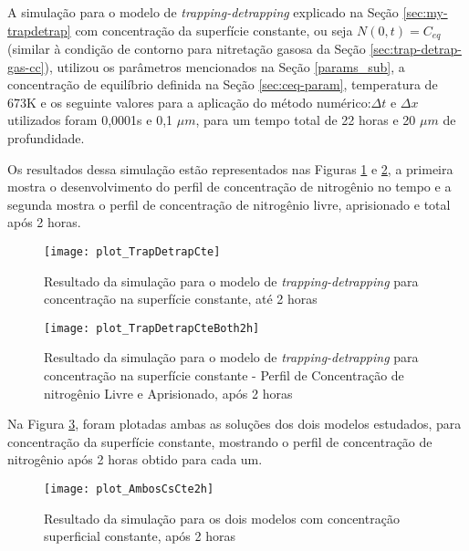\FloatBarrier


A simulação para o modelo de \textit{trapping-detrapping} explicado na Seção \ref{sec:my-trapdetrap} com concentração da superfície constante, ou seja $N(0,t)=C_{eq}$ (similar à condição de contorno para nitretação gasosa da Seção \ref{sec:trap-detrap-gas-cc}), utilizou os parâmetros mencionados na Seção \ref{params_sub}, a concentração de equilíbrio definida na Seção \ref{sec:ceq-param}, temperatura de 673K e os seguinte valores para a aplicação do método numérico:$\Delta t$ e $\Delta x$ utilizados foram 0,0001s e 0,1 $\mu m$, para um tempo total de 22 horas e 20 $\mu m$ de profundidade.

Os resultados dessa simulação estão representados nas Figuras \ref{fig:td-cscte1} e \ref{fig:td-cscte-both}, a primeira mostra o desenvolvimento do perfil de concentração de nitrogênio no tempo e a segunda mostra o perfil de concentração de nitrogênio livre, aprisionado e total após 2 horas.

\begin{figure}[hb]
\centering
	\caption{Resultado da simulação para o modelo de \textit{trapping-detrapping} para concentração na superfície constante, até 2 horas}
	\texttt{[image: plot\_TrapDetrapCte]}
	\label{fig:td-cscte1}
	\centering
\end{figure}


\begin{figure}[hb]
\centering
	\caption{Resultado da simulação para o modelo de \textit{trapping-detrapping} para concentração na superfície constante - Perfil de Concentração de nitrogênio Livre e Aprisionado, após 2 horas }
	\texttt{[image: plot\_TrapDetrapCteBoth2h]}
	\label{fig:td-cscte-both}
	\centering
\end{figure}

Na Figura \ref{fig:td-cscte-compara}, foram plotadas ambas as soluções dos dois modelos estudados, para concentração da superfície constante, mostrando o perfil de concentração de nitrogênio após 2 horas obtido para cada um.

\begin{figure}[ht]
\centering
	\caption{Resultado da simulação para os dois modelos com concentração superficial constante, após 2 horas }
	\texttt{[image: plot\_AmbosCsCte2h]}
	\label{fig:td-cscte-compara}
	\centering
\end{figure}
\FloatBarrier

